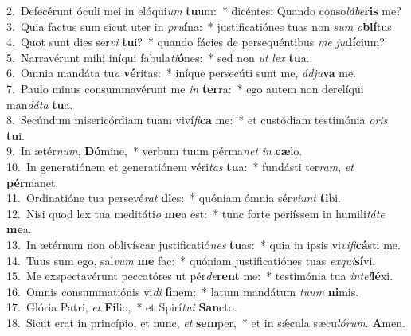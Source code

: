 {2.~}Defecérunt óculi mei in elóqui\textit{um} \textbf{tu}um:~* dicéntes: Quando conso\textit{lá}\textit{be}\textbf{ris} me?\\
{3.~}Quia factus sum sicut uter in \textit{pru}\textbf{í}na:~* justificatiónes tuas non \textit{sum} \textit{o}\textbf{blí}tus.\\
{4.~}Quot sunt dies ser\textit{vi} \textbf{tu}i?~* quando fácies de persequéntibus \textit{me} \textit{ju}\textbf{dí}cium?\\
{5.~}Narravérunt mihi iníqui fabula\textit{ti}\textbf{ó}nes:~* sed non \textit{ut} \textit{lex} \textbf{tu}a.\\
{6.~}Omnia mandáta tu\textit{a} \textbf{vé}ritas:~* iníque persecúti sunt me, \textit{ád}\textit{ju}\textbf{va} me.\\
{7.~}Paulo minus consummavérunt me \textit{in} \textbf{ter}ra:~* ego autem non derelíqui man\textit{dá}\textit{ta} \textbf{tu}a.\\
{8.~}Secúndum misericórdiam tuam viví\textit{fi}\textbf{ca} me:~* et custódiam testimónia \textit{o}\textit{ris} \textbf{tu}i.\\
{9.~}In ætér\textit{num}, \textbf{Dó}mine,~* verbum tuum pérma\textit{net} \textit{in} \textbf{cæ}lo.\\
{10.~}In generatiónem et generatiónem véri\textit{tas} \textbf{tu}a:~* fundásti ter\textit{ram}, \textit{et} \textbf{pér}manet.\\
{11.~}Ordinatióne tua persevé\textit{rat} \textbf{di}es:~* quóniam ómnia sér\textit{vi}\textit{unt} \textbf{ti}bi.\\
{12.~}Nisi quod lex tua meditáti\textit{o} \textbf{me}a est:~* tunc forte periíssem in humili\textit{tá}\textit{te} \textbf{me}a.\\
{13.~}In ætérnum non oblivíscar justificatió\textit{nes} \textbf{tu}as:~* quia in ipsis vi\textit{vi}\textit{fi}\textbf{cá}sti me.\\
{14.~}Tuus sum ego, sal\textit{vum} \textbf{me} fac:~* quóniam justificatiónes tuas \textit{ex}\textit{qui}\textbf{sí}vi.\\
{15.~}Me exspectavérunt peccatóres ut pér\textit{de}\textbf{rent} me:~* testimónia tua \textit{in}\textit{tel}\textbf{lé}xi.\\
{16.~}Omnis consummatiónis vi\textit{di} \textbf{fi}nem:~* latum mandátum \textit{tu}\textit{um} \textbf{ni}mis.\\
{17.~}Glória Patri, \textit{et} \textbf{Fí}lio,~* et Spirí\textit{tu}\textit{i} \textbf{San}cto.\\
{18.~}Sicut erat in princípio, et nunc, \textit{et} \textbf{sem}per,~* et in sǽcula sæcu\textit{ló}\textit{rum}. \textbf{A}men.\\

